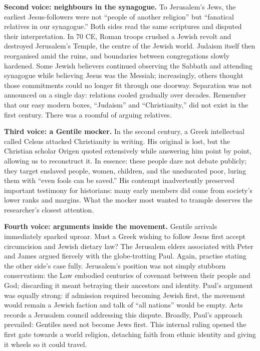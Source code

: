 \textbf{Second voice: neighbours in the synagogue.} To Jerusalem's Jews, the earliest Jesus-followers were not ``people of another religion'' but ``fanatical relatives in our synagogue.'' Both sides read the same scriptures and disputed their interpretation. In 70 CE, Roman troops crushed a Jewish revolt and destroyed Jerusalem's Temple, the centre of the Jewish world. Judaism itself then reorganised amid the ruins, and boundaries between congregations slowly hardened. Some Jewish believers continued observing the Sabbath and attending synagogue while believing Jesus was the Messiah; increasingly, others thought those commitments could no longer fit through one doorway. Separation was not announced on a single day: relations cooled gradually over decades. Remember that our easy modern boxes, ``Judaism'' and ``Christianity,'' did not exist in the first century. There was a roomful of arguing relatives.

\textbf{Third voice: a Gentile mocker.} In the second century, a Greek intellectual called Celsus attacked Christianity in writing. His original is lost, but the Christian scholar Origen quoted extensively while answering him point by point, allowing us to reconstruct it. In essence: these people dare not debate publicly; they target enslaved people, women, children, and the uneducated poor, luring them with ``even fools can be saved.'' His contempt inadvertently preserved important testimony for historians: many early members did come from society's lower ranks and margins. What the mocker most wanted to trample deserves the researcher's closest attention.

\textbf{Fourth voice: arguments inside the movement.} Gentile arrivals immediately sparked uproar. Must a Greek wishing to follow Jesus first accept circumcision and Jewish dietary law? The Jerusalem elders associated with Peter and James argued fiercely with the globe-trotting Paul. Again, practise stating the other side's case fully. Jerusalem's position was not simply stubborn conservatism: the Law embodied centuries of covenant between their people and God; discarding it meant betraying their ancestors and identity. Paul's argument was equally strong: if admission required becoming Jewish first, the movement would remain a Jewish faction and talk of ``all nations'' would be empty. Acts records a Jerusalem council addressing this dispute. Broadly, Paul's approach prevailed: Gentiles need not become Jews first. This internal ruling opened the first gate towards a world religion, detaching faith from ethnic identity and giving it wheels so it could travel.

